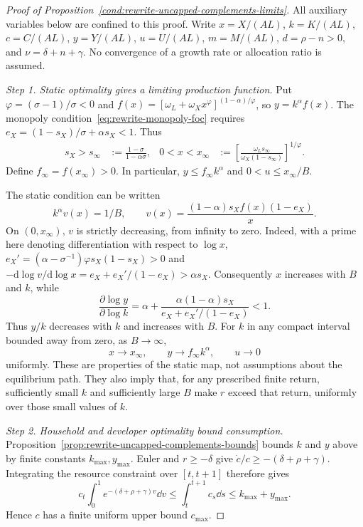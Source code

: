\begin{proof}[Proof of Proposition~\ref{cond:rewrite-uncapped-complements-limits}]
\label{proof:rewrite-uncapped-complements-limits}
All auxiliary variables below are confined to this proof. Write
$x=X/(AL)$, $k=K/(AL)$, $c=C/(AL)$, $y=Y/(AL)$, $u=U/(AL)$,
$m=M/(AL)$, $d=\rho-n>0$, and $\nu=\delta+n+\gamma$.
No convergence of a growth rate or allocation ratio is assumed.

\textit{Step 1. Static optimality gives a limiting production function.}
Put $\varphi=(\sigma-1)/\sigma<0$ and
$f(x)=[\omega_L+\omega_Xx^\varphi]^{(1-\alpha)/\varphi}$, so $y=k^\alpha f(x)$.
The monopoly condition~\eqref{eq:rewrite-monopoly-foc} requires
$e_X=(1-s_X)/\sigma+\alpha s_X<1$. Thus
\begin{align}
 s_X>s_\infty&:=\frac{1-\sigma}{1-\alpha\sigma},&
 0<x<x_\infty&:=
 \left[\frac{\omega_Ls_\infty}{\omega_X(1-s_\infty)}\right]^{1/\varphi}.
 \label{eq:rewrite-uncapped-complements-x-limit}
\end{align}
Define $f_\infty=f(x_\infty)>0$.
In particular, $y\leq f_\infty k^\alpha$ and $0<u\leq x_\infty/B$.

The static condition can be written
\[
 k^\alpha v(x)=1/B,\qquad
 v(x)=\frac{(1-\alpha)s_Xf(x)(1-e_X)}x.
\]
On $(0,x_\infty)$, $v$ is strictly decreasing, from infinity to zero.
Indeed, with a prime here denoting differentiation with respect to $\log x$,
$e_X'=(\alpha-\sigma^{-1})\varphi s_X(1-s_X)>0$ and
$-\mathrm d\log v/\mathrm d\log x=e_X+e_X'/(1-e_X)>\alpha s_X$.
Consequently $x$ increases with $B$ and $k$, while
\[
 \frac{\partial\log y}{\partial\log k}
 =\alpha+\frac{\alpha(1-\alpha)s_X}{e_X+e_X'/(1-e_X)}<1.
\]
Thus $y/k$ decreases with $k$ and increases with $B$.
For $k$ in any compact interval bounded away from zero, as $B\to\infty$,
\[
 x\to x_\infty,\qquad y\to f_\infty k^\alpha,\qquad u\to0
\]
uniformly. These are properties of the static map, not assumptions about
the equilibrium path. They also imply that, for any prescribed finite
return, sufficiently small $k$ and sufficiently large $B$ make $r$ exceed
that return, uniformly over those small values of $k$.

\textit{Step 2. Household and developer optimality bound consumption.}
Proposition~\ref{prop:rewrite-uncapped-complements-bounds} bounds $k$ and
$y$ above by finite constants $k_{\max},y_{\max}$.
Euler and $r\geq-\delta$ give $\dot c/c\geq-(\delta+\rho+\gamma)$.
Integrating the resource constraint over $[t,t+1]$ therefore gives
\[
 c_t\int_0^1 e^{-(\delta+\rho+\gamma)v}\dd v
 \leq\int_t^{t+1}c_s\dd s\leq k_{\max}+y_{\max}.
\]
Hence $c$ has a finite uniform upper bound $c_{\max}$.


\end{proof}
